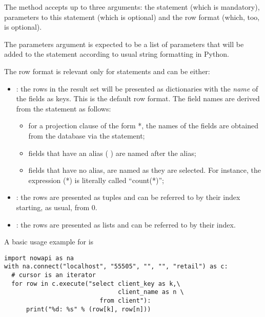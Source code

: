 The  method accepts up to three arguments:
the statement (which is mandatory), parameters to this
statement (which is optional) and the row format (which, too,
is optional).

The parameters argument is expected to be a list of parameters
that will be added to the statement according
to usual string formatting in Python.

The row format is relevant only for 
statements and can be either:

\begin{itemize}
\item {}: 
      the rows in the result set will be presented as dictionaries
      with the \emph{name} of the fields as keys.
      This is the default row format.
      The field names are derived from the statement as follows:
      \begin{itemize}
      \item for a projection clause of the form  *,
            the names of the fields are obtained from the database via
            the  statement;
      \item fields that have an alias
            (   )
            are named after the alias;
      \item fields that have no alias, are named as they are selected.
            For instance, the expression (*) is
            literally called ``count(*)''; 
      \end{itemize}
\item {}:
      the rows are presented as tuples and can be referred to by their index
      starting, as usual, from 0.
\item {}:
      the rows are presented as lists and can be referred to by their index.
\end{itemize}

A basic usage example for  is

\begin{python}
\begin{lstlisting}
import nowapi as na
with na.connect("localhost", "55505", "", "", "retail") as c:
  # cursor is an iterator
  for row in c.execute("select client_key as k,\
                               client_name as n \
                          from client"):
      print("%d: %s" % (row[k], row[n]))
\end{lstlisting}
\end{python}

